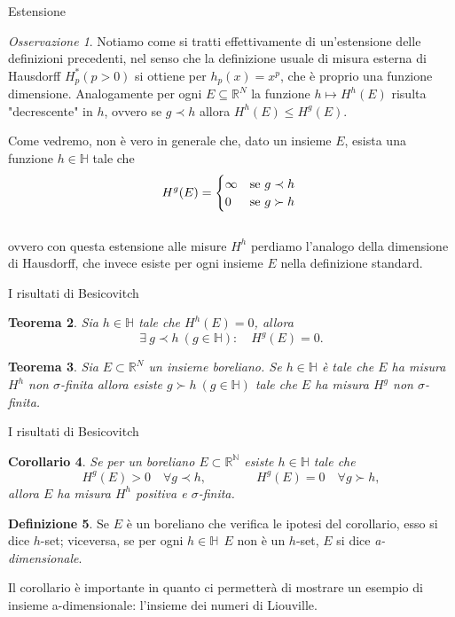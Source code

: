 \documentclass[intlimits]{beamer}
\numberwithin{equation}{section}
\theoremstyle{plain}
\newtheorem{teor}{Teorema}[section]
\newtheorem{cor}[teor]{Corollario}
\theoremstyle{definition}
\newtheorem{defin}[teor]{Definizione}
\theoremstyle{remark}
\newtheorem{oss}[teor]{Osservazione}
\renewcommand{\leq}{\leqslant}
\begin{document}
\begin{frame}{Estensione}
\begin{oss} Notiamo come si tratti effettivamente di un'estensione delle definizioni precedenti,
nel senso che la definizione usuale di misura esterna di Hausdorff 
$H^{*}_p ( p > 0 )$ si ottiene per $h_p(x) = x^p$, che è proprio una funzione dimensione.
Analogamente per ogni $E\subseteq \mathbb{R}^N$ la funzione $h\longmapsto H^h(E)$ risulta "decrescente" in $h$,
ovvero se $g \prec h$ allora $H^h(E)\leq H^g(E)$.\end{oss}
\pause
Come vedremo, non è vero in generale che, dato un insieme $E$, esista una funzione $h \in \mathbb{H}$ tale che\\
\[ H^{g}(E) = \begin{cases}
    \infty & \text{se $g \prec h$ }\\
    0 & \text{se $ g\succ h$}
\end{cases}\]\\
\pause
ovvero con questa estensione alle misure $H^h$ perdiamo l'analogo della dimensione di Hausdorff,
che invece esiste per ogni insieme $E$ nella definizione standard.
\end{frame}


\begin{frame}{I risultati di Besicovitch}
\begin{teor} Sia $h \in \mathbb{H}$ tale che $H^{h}(E) = 0$, allora
\[ \exists\ g \prec h \ (g \in \mathbb{H}): \quad H^{g}(E) = 0.\]
\end{teor}
\bigskip
\pause
\begin{teor} Sia $E \subset \mathbb{R}^N$ un insieme boreliano. Se $h \in \mathbb{H}$ è tale 
che $E$ ha misura $H^h$ non $\sigma$-finita allora esiste
$g \succ h \ (g \in \mathbb{H})$ tale che $E$ ha misura $H^g$ non $\sigma$-finita.
\end{teor}
\end{frame}


\begin{frame}{I risultati di Besicovitch}
\begin{cor} Se per un boreliano $E \subset \mathbb{R^N}$ esiste $h \in \mathbb{H}$ tale che
\[H^g(E) > 0 \quad \forall g \prec h, \qquad \qquad H^g(E) = 0 \quad \forall g \succ h,\]
allora $E$ ha misura $H^h$ positiva e $\sigma$-finita.\end{cor}
\pause
\begin{defin} Se $E$ è un boreliano che verifica le ipotesi del corollario, esso si dice $h$-set; 
viceversa, se per ogni $h \in \mathbb{H} \ \ E$ non è un $h$-set,  $E$ si dice \textit{a-dimensionale}. \end{defin} 
\pause Il corollario è importante in quanto ci permetterà di mostrare
un esempio di insieme a-dimensionale: l'insieme dei numeri di Liouville.
\end{frame}
\end{document}
